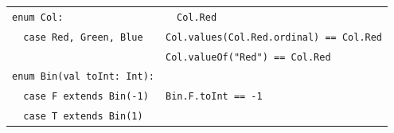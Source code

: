 \documentclass[article, a5paper]{memoir}
\newcommand{\LangColor}{red}
\newcommand{\head}[1]{{\bfseries {\color{\LangColor}{#1}}\par\vspace{1mm}\hrule\vspace{-2mm}}}
\renewcommand{\arraystretch}{0.9}
\newcommand{\code}{\lstinline[basicstyle=\ttfamily]}
\newcommand{\Comment}[1]{{\color{commentgreen}{#1}}}
\begin{document}
\vspace{0.5em}\head{Enumerations}

\vspace{0.9em}\renewcommand{\arraystretch}{1.0}
{\small%
\begin{tabular}{@{}l @{\hspace{0.3em}}l}
\code|enum Col:| & \Comment{Col is a sealed class, values in companion of type Col:}~~\code|Col.Red| ~ \Comment{etc.}   \\
\code|  case Red, Green, Blue| & \Comment{Array of values:} \texttt{Col.values(Col.Red.ordinal) == Col.Red} \\
& \Comment{value from String:} \code|Col.valueOf("Red") == Col.Red| \\ 
\code|enum Bin(val toInt: Int):| &  \Comment{\textbf{parameterized enum} val is needed for class param to be externally visible.}\\
\code|  case F extends Bin(-1)| & \Comment{get parameter from case value:} \code|Bin.F.toInt == -1|\\
\code|  case T extends Bin(1)| & \Comment{you can also define case members (def, val, etc) inside enums}\\

\end{tabular}
}%

%
\end{document}
